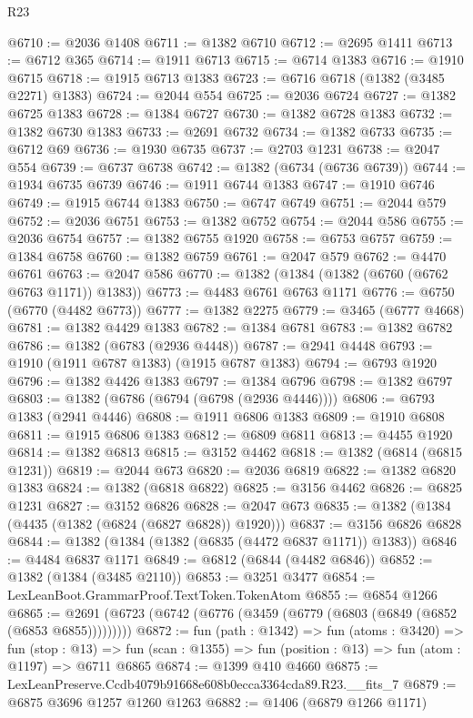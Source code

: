 \begin{lexlean}{R23}
\begin{coremodule}
@6710 := @2036 @1408
@6711 := @1382 @6710
@6712 := @2695 @1411
@6713 := @6712 @365
@6714 := @1911 @6713
@6715 := @6714 @1383
@6716 := @1910 @6715
@6718 := @1915 @6713 @1383
@6723 := @6716 @6718 (@1382 (@3485 @2271) @1383)
@6724 := @2044 @554
@6725 := @2036 @6724
@6727 := @1382 @6725 @1383
@6728 := @1384 @6727
@6730 := @1382 @6728 @1383
@6732 := @1382 @6730 @1383
@6733 := @2691 @6732
@6734 := @1382 @6733
@6735 := @6712 @69
@6736 := @1930 @6735
@6737 := @2703 @1231
@6738 := @2047 @554
@6739 := @6737 @6738
@6742 := @1382 (@6734 (@6736 @6739))
@6744 := @1934 @6735 @6739
@6746 := @1911 @6744 @1383
@6747 := @1910 @6746
@6749 := @1915 @6744 @1383
@6750 := @6747 @6749
@6751 := @2044 @579
@6752 := @2036 @6751
@6753 := @1382 @6752
@6754 := @2044 @586
@6755 := @2036 @6754
@6757 := @1382 @6755 @1920
@6758 := @6753 @6757
@6759 := @1384 @6758
@6760 := @1382 @6759
@6761 := @2047 @579
@6762 := @4470 @6761
@6763 := @2047 @586
@6770 := @1382 (@1384 (@1382 (@6760 (@6762 @6763 @1171)) @1383))
@6773 := @4483 @6761 @6763 @1171
@6776 := @6750 (@6770 (@4482 @6773))
@6777 := @1382 @2275
@6779 := @3465 (@6777 @4668)
@6781 := @1382 @4429 @1383
@6782 := @1384 @6781
@6783 := @1382 @6782
@6786 := @1382 (@6783 (@2936 @4448))
@6787 := @2941 @4448
@6793 := @1910 (@1911 @6787 @1383) (@1915 @6787 @1383)
@6794 := @6793 @1920
@6796 := @1382 @4426 @1383
@6797 := @1384 @6796
@6798 := @1382 @6797
@6803 := @1382 (@6786 (@6794 (@6798 (@2936 @4446))))
@6806 := @6793 @1383 (@2941 @4446)
@6808 := @1911 @6806 @1383
@6809 := @1910 @6808
@6811 := @1915 @6806 @1383
@6812 := @6809 @6811
@6813 := @4455 @1920
@6814 := @1382 @6813
@6815 := @3152 @4462
@6818 := @1382 (@6814 (@6815 @1231))
@6819 := @2044 @673
@6820 := @2036 @6819
@6822 := @1382 @6820 @1383
@6824 := @1382 (@6818 @6822)
@6825 := @3156 @4462
@6826 := @6825 @1231
@6827 := @3152 @6826
@6828 := @2047 @673
@6835 := @1382 (@1384 (@4435 (@1382 (@6824 (@6827 @6828)) @1920)))
@6837 := @3156 @6826 @6828
@6844 := @1382 (@1384 (@1382 (@6835 (@4472 @6837 @1171)) @1383))
@6846 := @4484 @6837 @1171
@6849 := @6812 (@6844 (@4482 @6846))
@6852 := @1382 (@1384 (@3485 @2110))
@6853 := @3251 @3477
@6854 := LexLeanBoot.GrammarProof.TextToken.TokenAtom
@6855 := @6854 @1266
@6865 := @2691 (@6723 (@6742 (@6776 (@3459 (@6779 (@6803 (@6849 (@6852 (@6853 @6855)))))))))
@6872 := fun (path : @1342) =>
  fun (atoms : @3420) =>
  fun (stop : @13) =>
  fun (scan : @1355) => fun (position : @13) => fun (atom : @1197) => @6711 @6865
@6874 := @1399 @410 @4660
@6875 := LexLeanPreserve.Ccdb4079b91668e608b0ecca3364cda89.R23.__fits_7
@6879 := @6875 @3696 @1257 @1260 @1263
@6882 := @1406 (@6879 @1266 @1171)

\end{coremodule}
\end{lexlean}
